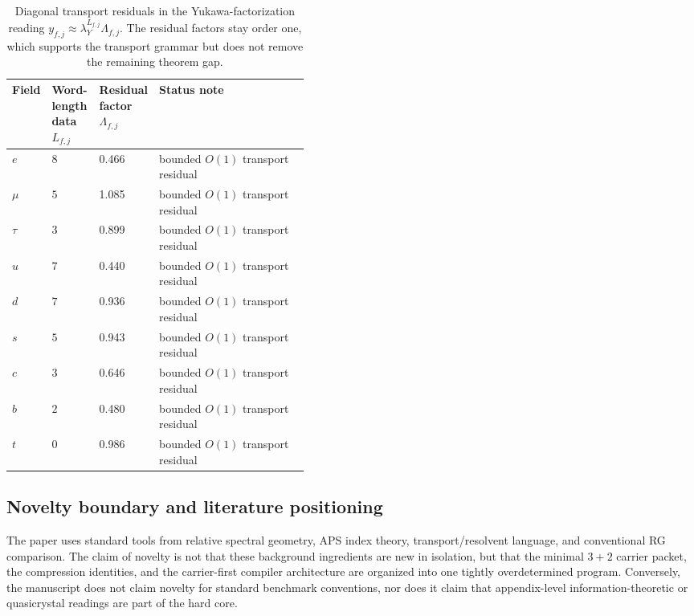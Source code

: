 \begin{table}[H]
\centering
\scriptsize
\begin{tabularx}{\linewidth}{@{}>{\raggedright\arraybackslash}p{0.11\linewidth}>{\centering\arraybackslash}p{0.16\linewidth}>{\raggedleft\arraybackslash}p{0.16\linewidth}Y@{}}
\toprule
Field & Word-length data $L_{f,j}$ & Residual factor $\Lambda_{f,j}$ & Status note \\
\midrule
$e$ & $8$ & \num{0.466} & bounded $O(1)$ transport residual \\
$\mu$ & $5$ & \num{1.085} & bounded $O(1)$ transport residual \\
$\tau$ & $3$ & \num{0.899} & bounded $O(1)$ transport residual \\
$u$ & $7$ & \num{0.440} & bounded $O(1)$ transport residual \\
$d$ & $7$ & \num{0.936} & bounded $O(1)$ transport residual \\
$s$ & $5$ & \num{0.943} & bounded $O(1)$ transport residual \\
$c$ & $3$ & \num{0.646} & bounded $O(1)$ transport residual \\
$b$ & $2$ & \num{0.480} & bounded $O(1)$ transport residual \\
$t$ & $0$ & \num{0.986} & bounded $O(1)$ transport residual \\
\bottomrule
\end{tabularx}
\caption{Diagonal transport residuals in the Yukawa-factorization reading $y_{f,j}\approx \lambda_Y^{L_{f,j}}\Lambda_{f,j}$. The residual factors stay order one, which supports the transport grammar but does not remove the remaining theorem gap.}
\label{tab:yukawa-residuals}
\end{table}

\subsection{Novelty boundary and literature positioning}

The paper uses standard tools from relative spectral geometry, APS index theory, transport/resolvent language, and conventional RG comparison. The claim of novelty is not that these background ingredients are new in isolation, but that the minimal $3+2$ carrier packet, the compression identities, and the carrier-first compiler architecture are organized into one tightly overdetermined program. Conversely, the manuscript does not claim novelty for standard benchmark conventions, nor does it claim that appendix-level information-theoretic or quasicrystal readings are part of the hard core.

